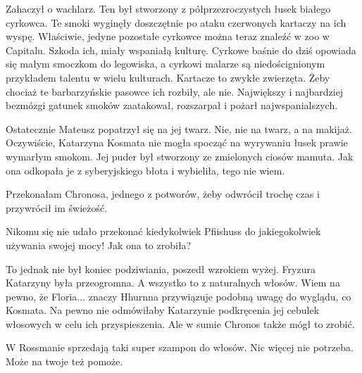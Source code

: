 Zahaczył o wachlarz.
Ten był stworzony z półprzezroczystych łusek białego cyrkowca.
Te smoki wyginęły doszczętnie po ataku czerwonych kartaczy na ich wyspę.
Właściwie, jedyne pozostałe cyrkowce można teraz znaleźć w zoo w Capitalu.
Szkoda ich, miały wspaniałą kulturę.
Cyrkowe baśnie do dziś opowiada się małym smoczkom do legowiska, a cyrkowi malarze są niedoścignionym przykładem talentu w wielu kulturach.
Kartacze to zwykłe zwierzęta. Żeby chociaż te barbarzyńskie pasowce ich rozbiły, ale nie. Największy i najbardziej bezmózgi gatunek smoków zaatakował, rozszarpał i pożarł najwspanialszych.

Ostatecznie Mateusz popatrzył się na jej twarz.
Nie, nie na twarz, a na makijaż.
Oczywiście, Katarzyna Kosmata nie mogła spocząć na wyrywaniu łusek prawie wymarłym smokom.
Jej puder był stworzony ze zmielonych ciosów mamuta.
Jak ona odkopała je z syberyjskiego błota i wybieliła, tego nie wiem.
\begin{dialogue}
\ds{} Przekonałam Chronosa, jednego z potworów, żeby odwrócił trochę czas i przywrócił im świeżość.
\end{dialogue}

Nikomu się nie udało przekonać kiedykolwiek Pfiishuss do jakiegokolwiek używania swojej mocy! Jak ona to zrobiła?

To jednak nie był koniec podziwiania, poszedł wzrokiem wyżej.
Fryzura Katarzyny była przeogromna. A wszystko to z naturalnych włosów. Wiem na pewno, że Floria... znaczy Hhurnna przywiązuje podobną uwagę do wyglądu, co Kosmata. Na pewno nie odmówiłaby Katarzynie podkręcenia jej cebulek włosowych w celu ich przyspieszenia. Ale w sumie Chronos także mógł to zrobić.
\begin{dialogue}
\ds{} W Rossmanie sprzedają taki super szampon do włosów. Nic więcej nie potrzeba. Może na twoje też pomoże. 
\end{dialogue}

